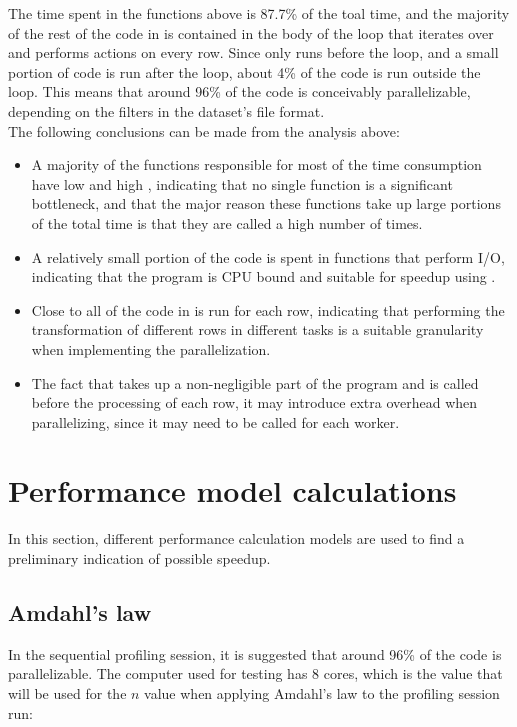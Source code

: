 The time spent in the functions above is 87.7\% of the toal time, and the majority of the rest of the code in  is contained in the body of the loop that iterates
over and performs actions on every row. Since only  runs before the loop, and a small portion of code is run after the loop, about 4\% of the code 
is run outside the loop. This means that around 96\% of the code is conceivably parallelizable, depending on the filters in the dataset's file format.\\

The following conclusions can be made from the analysis above:

\begin{itemize}
  \item A majority of the functions responsible for most of the time consumption have low  and high , indicating that no single function is
    a significant bottleneck, and that the major reason these functions take up large portions of the total time is that they are called a high number of times.
  \item A relatively small portion of the code is spent in functions that perform I/O, indicating that the program is CPU bound and suitable for speedup using
    .
  \item Close to all of the code in  is run for each row, indicating that performing the transformation of different rows in different tasks is a
    suitable granularity when implementing the parallelization.
  \item The fact that  takes up a non-negligible part of the program and is called before the processing of each row, it may introduce extra overhead
    when parallelizing, since it may need to be called for each worker.
\end{itemize}

\section{Performance model calculations}
In this section, different performance calculation models are used to find a preliminary indication of possible speedup.

\subsection{Amdahl's law}
In the sequential profiling session, it is suggested that around 96\% of the code is parallelizable. The computer used for testing has 8 cores,
which is the value that will be used for the $n$ value when applying Amdahl's law to the profiling session run:

